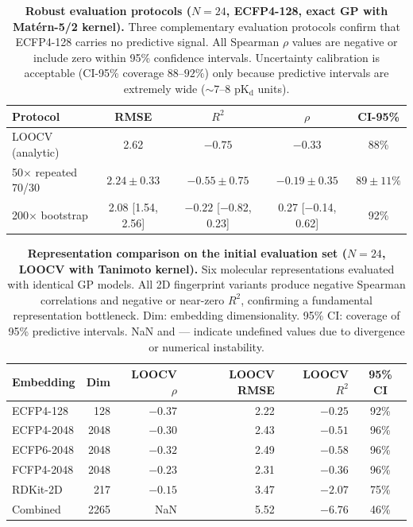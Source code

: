 \documentclass{article}
\newcommand{\pKd}{\mathrm{pK_d}}
\begin{document}
\begin{table}[h!]
\centering
\caption{\textbf{Robust evaluation protocols ($N = 24$, ECFP4-128,
exact GP with Mat\'ern-5/2 kernel).}
Three complementary evaluation protocols confirm that ECFP4-128 carries
no predictive signal.  All Spearman $\rho$ values are negative or
include zero within 95\% confidence intervals.  Uncertainty
calibration is acceptable (CI-95\% coverage $88$--$92\%$) only because
predictive intervals are extremely wide (${\sim}7$--$8$ $\pKd$ units).}
\label{tab:robust_eval}
\begin{tabular}{@{}lcccc@{}}
\toprule
Protocol & RMSE & $R^{2}$ & $\rho$ & CI-95\% \\
\midrule
LOOCV (analytic)         & 2.62 & $-0.75$ & $-0.33$ & 88\% \\
50$\times$ repeated 70/30 & $2.24 \pm 0.33$ & $-0.55 \pm 0.75$ & $-0.19 \pm 0.35$ & $89 \pm 11\%$ \\
200$\times$ bootstrap    & 2.08 \small{[1.54, 2.56]} & $-0.22$ \small{[$-$0.82, 0.23]} & 0.27 \small{[$-$0.14, 0.62]} & 92\% \\
\bottomrule
\end{tabular}
\end{table}

\begin{table}[h!]
\centering
\caption{\textbf{Representation comparison on the initial evaluation set
($N = 24$, LOOCV with Tanimoto kernel).}
Six molecular representations evaluated with identical GP models.  All 2D
fingerprint variants produce negative Spearman correlations and negative
or near-zero $R^{2}$, confirming a fundamental representation
bottleneck.  Dim: embedding dimensionality.  95\% CI: coverage of 95\%
predictive intervals.  NaN and --- indicate undefined values due to
divergence or numerical instability.}
\label{tab:rep_n24}
\begin{tabular}{@{}lrrrrc@{}}
\toprule
Embedding & Dim & LOOCV $\rho$ & LOOCV RMSE & LOOCV $R^{2}$ & 95\% CI \\
\midrule
ECFP4-128   &  128  & $-0.37$ & 2.22 & $-0.25$ & 92\% \\
ECFP4-2048  & 2048  & $-0.30$ & 2.43 & $-0.51$ & 96\% \\
ECFP6-2048  & 2048  & $-0.32$ & 2.49 & $-0.58$ & 96\% \\
FCFP4-2048  & 2048  & $-0.23$ & 2.31 & $-0.36$ & 96\% \\
RDKit-2D    &  217  & $-0.15$ & 3.47 & $-2.07$ & 75\% \\
Combined    & 2265  & NaN     & 5.52 & $-6.76$ & 46\% \\
\bottomrule
\end{tabular}
\end{table}
\end{document}
